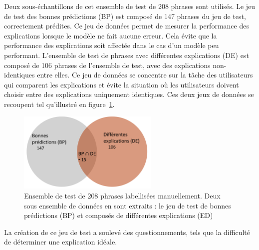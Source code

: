 Deux sous-échantillons de cet ensemble de test de 208 phrases sont utilisés. Le jeu de test des bonnes prédictions (BP) est composé de 147 phrases du jeu de test, correctement prédites. Ce jeu de données permet de mesurer la performance des explications lorsque le modèle ne fait aucune erreur. Cela évite que la performance des explications soit affectée dans le cas d'un modèle peu performant. L'ensemble de test de phrases avec différentes explications (DE) est composé de 106 phrases de l'ensemble de test, avec des explications non-identiques entre elles. Ce jeu de données se concentre sur la tâche des utilisateurs qui comparent les explications et évite la situation où les utilisateurs doivent choisir entre des explications uniquement identiques. Ces deux jeux de données se recoupent tel qu'illustré en figure~\ref{fig:lego_test_sets}.

\begin{figure}[htpb!]
    \centering
    \includegraphics[width=0.6\textwidth]{./S2-Explicabilite_locale/figures/lego_test_sets.png}
    \caption{Ensemble de test de 208 phrases labellisées manuellement. Deux sous ensemble de données en sont extraits : le jeu de test de bonnes prédictions (BP) et composés de différentes explications (ED)}
    \label{fig:lego_test_sets}
\end{figure}

La création de ce jeu de test a soulevé des questionnements, tels que la difficulté de déterminer une explication idéale.


